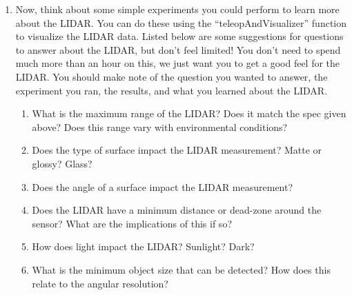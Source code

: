 \documentclass[M3_Night5_Solutions]{subfiles}
\begin{document}
\begin{enumerate}[series=exercises, label=\textbf{Exercise} (\arabic*)]

\item Now, think about some simple experiments you could perform to learn more about the LIDAR. You can do these using the ``teleopAndVisualizer'' function to visualize the LIDAR data. Listed below are some suggestions for questions to answer about the LIDAR, but don't feel limited! You don't need to spend much more than an hour on this, we just want you to get a good feel for the LIDAR. You should make note of the question you wanted to answer, the experiment you ran, the results, and what you learned about the LIDAR.
\begin{enumerate}
\item What is the maximum range of the LIDAR? Does it match the spec given above? Does this range vary with environmental conditions?

\item Does the type of surface impact the LIDAR measurement? Matte or glossy? Glass?

\item Does the angle of a surface impact the LIDAR measurement?

\item Does the LIDAR have a minimum distance or dead-zone around the sensor? What are the implications of this if so?

\item How does light impact the LIDAR? Sunlight? Dark?

\item What is the minimum object size that can be detected? How does this relate to the angular resolution?
\end{enumerate}
\end{enumerate}
\end{document}
